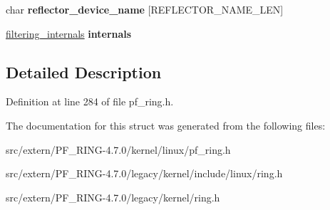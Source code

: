 \begin{DoxyCompactItemize}
\item 
\hypertarget{structfiltering__rule_a7fb3d081379b7b2fe827e76ca5fb6ea4}{
char {\bfseries reflector\_\-device\_\-name} \mbox{[}REFLECTOR\_\-NAME\_\-LEN\mbox{]}}
\label{structfiltering__rule_a7fb3d081379b7b2fe827e76ca5fb6ea4}

\item 
\hypertarget{structfiltering__rule_af78a8218c26d7bf23d4395a9be6e1552}{
\hyperlink{structfiltering__internals}{filtering\_\-internals} {\bfseries internals}}
\label{structfiltering__rule_af78a8218c26d7bf23d4395a9be6e1552}

\end{DoxyCompactItemize}


\subsection{Detailed Description}


Definition at line 284 of file pf\_\-ring.h.



The documentation for this struct was generated from the following files:\begin{DoxyCompactItemize}
\item 
src/extern/PF\_\-RING-\/4.7.0/kernel/linux/pf\_\-ring.h\item 
src/extern/PF\_\-RING-\/4.7.0/legacy/kernel/include/linux/ring.h\item 
src/extern/PF\_\-RING-\/4.7.0/legacy/kernel/ring.h\end{DoxyCompactItemize}
